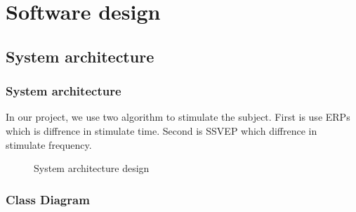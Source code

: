 \chapter{Software design}

\label{ch:Software design}

\setlength{\parindent}{4em}
\setlength{\parskip}{1em}
\renewcommand{\baselinestretch}{1.5}

\section{System architecture}

\subsection{System architecture}
\hspace{1.5cm}In our project, we use two algorithm to stimulate the subject. First is use ERPs which is diffrence in stimulate time. Second is SSVEP which diffrence in stimulate frequency.

\begin{figure}[h]
	\centering
	\caption{System architecture design}
\end{figure}
\subsection{Class Diagram}